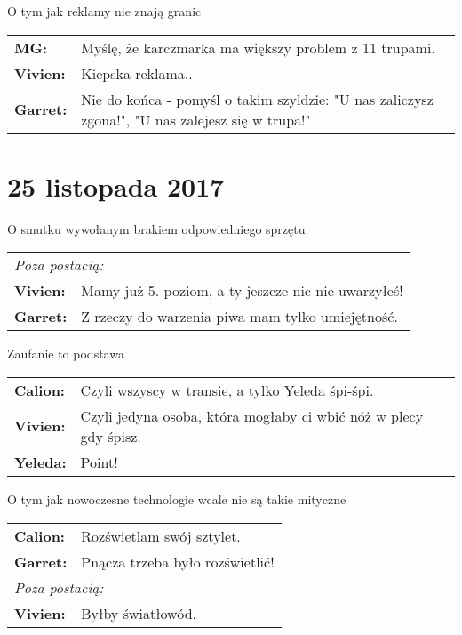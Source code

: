 \documentclass[10pt,twoside,twocolumn]{book}
\begin{document}
\begin{rpg-quotebox}{O tym jak reklamy nie znają granic}
   \begin{tabularx}{\columnwidth}{lX}
      \textbf{MG:} & Myślę, że karczmarka ma większy problem z 11 trupami.\\
      \textbf{Vivien:} & Kiepska reklama..\\
      \textbf{Garret:} & Nie do końca - pomyśl o takim szyldzie: "U nas zaliczysz zgona!", "U nas zalejesz się w trupa!"\\
   \end{tabularx}
\end{rpg-quotebox}

\section*{25 listopada 2017}

\begin{rpg-quotebox}{O smutku wywołanym brakiem odpowiedniego sprzętu}
   \begin{tabularx}{\columnwidth}{lX}
      \multicolumn{2}{l}{\textit{Poza postacią:}}\\
      \textbf{Vivien:} & Mamy już 5. poziom, a ty jeszcze nic nie uwarzyłeś!\\
      \textbf{Garret:} & Z rzeczy do warzenia piwa mam tylko umiejętność.\\
   \end{tabularx}
\end{rpg-quotebox}

\begin{rpg-quotebox}{Zaufanie to podstawa}
   \begin{tabularx}{\columnwidth}{lX}
      \textbf{Calion:} & Czyli wszyscy w transie, a tylko Yeleda śpi-śpi.\\
      \textbf{Vivien:} & Czyli jedyna osoba, która mogłaby ci wbić nóż w plecy gdy śpisz.\\
      \textbf{Yeleda:} & Point!\\
   \end{tabularx}
\end{rpg-quotebox}

\begin{rpg-quotebox}{O tym jak nowoczesne technologie wcale nie są takie mityczne}
   \begin{tabularx}{\columnwidth}{lX}
      \textbf{Calion:} & Rozświetlam swój sztylet.\\
      \textbf{Garret:} & Pnącza trzeba było rozświetlić!\\
      \multicolumn{2}{l}{\textit{Poza postacią:}}\\
      \textbf{Vivien:} & Byłby światłowód.\\
   \end{tabularx}
\end{rpg-quotebox}
\end{document}
